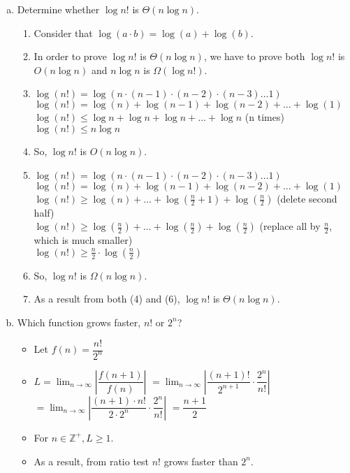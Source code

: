 \documentclass[11pt]{article}
\begin{document}
\begin{enumerate}[a)]
    \item Determine whether $\log n!$ is $\Theta (n \log n)$.
        \begin{enumerate}[1)]
            \item Consider that $\log (a \cdot b) = \log (a) + \log (b)$.
            \item In order to prove $\log n!$ is $\Theta (n \log n)$, we have to prove both $\log n!$ is $O (n \log n)$ and $n \log n$ is $\Omega (\log n!)$.
            \item $\log (n!) = \log (n \cdot (n-1) \cdot (n-2) \cdot (n-3) \dots 1)$ \\
                $\log (n!) = \log (n) + \log (n-1) + \log (n-2) + \dots + \log (1)$ \\
                $\log (n!) \leq \log n + \log n + \log n + \dots + \log n$ (n times) \\
                $\log (n!) \leq n \log n$
            \item So, $\log n!$ is $O (n \log n)$.
            \item $\log (n!) = \log (n \cdot (n-1) \cdot (n-2) \cdot (n-3) \dots 1)$ \\
                $\log (n!) = \log (n) + \log (n-1) + \log (n-2) + \dots + \log (1)$ \\
                $\log (n!) \geq \log (n) + \dots + \log (\frac{n}{2}+1) + \log (\frac{n}{2})$  (delete second half) \\
                $\log (n!) \geq \log (\frac{n}{2}) + \dots + \log (\frac{n}{2}) + \log (\frac{n}{2})$ (replace all by $\frac{n}{2}$, which is much smaller) \\
                $\log (n!) \geq \frac{n}{2} \cdot \log (\frac{n}{2})$
            \item So, $\log n!$ is $\Omega (n \log n)$.
            \item As a result from both (4) and (6), $\log n!$ is $\Theta (n \log n)$.
        \end{enumerate}{}
        
    \item Which function grows faster, $n!$ or $2^n$?
        \begin{itemize}
            \item Let $f(n) = \dfrac{n!}{2^n}$
            \item $L = \lim_{n \rightarrow \infty} |\dfrac{f(n+1)}{f(n)}|$
                $ = \lim_{n \rightarrow \infty} |\dfrac{(n+1)!}{2^{n+1}} \cdot \dfrac{2^n}{n!}|$
                $ = \lim_{n \rightarrow \infty} |\dfrac{(n+1) \cdot n!}{2 \cdot 2^n} \cdot \dfrac{2^n}{n!}|$
                $ = \dfrac{n+1}{2}$
            \item For $n \in \mathbb{Z}^+, L \geq 1$.
            \item As a result, from ratio test $n!$ grows faster than $2^n$.
        \end{itemize}{}
\end{enumerate}
\end{document}
